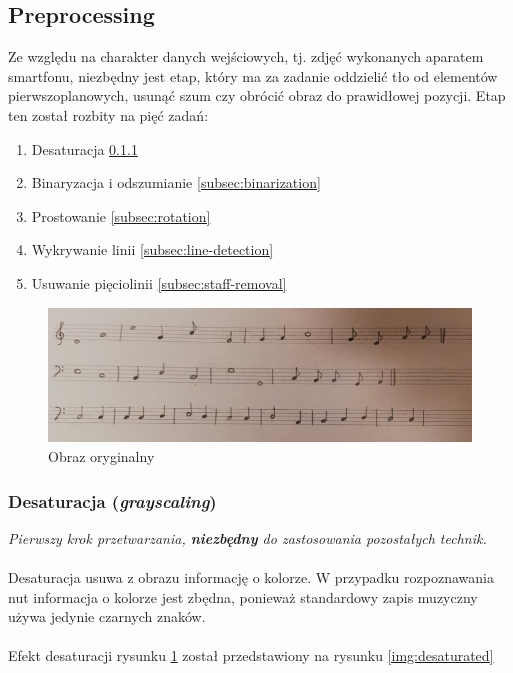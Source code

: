 \documentclass[12pt, letterpaper]{article}
\begin{document}
\subsection{Preprocessing}
\label{sec:preprocessing}

Ze względu na charakter danych wejściowych, tj. zdjęć wykonanych aparatem smartfonu,
niezbędny jest etap, który ma za zadanie oddzielić tło od elementów pierwszoplanowych,
usunąć szum czy obrócić obraz do prawidłowej pozycji.
Etap ten został rozbity na pięć zadań:

\begin{enumerate}
    \item Desaturacja \ref{subsec:desaturation}
    \item Binaryzacja i odszumianie \ref{subsec:binarization}
    \item Prostowanie \ref{subsec:rotation}
    \item Wykrywanie linii \ref{subsec:line-detection}
    \item Usuwanie pięciolinii \ref{subsec:staff-removal}
\end{enumerate}

\begin{figure}
    \centering
    \includegraphics[width = \imagewidth]{0_source}
    \caption[Source]{Obraz oryginalny}
    \label{img:source}
\end{figure}

\subsubsection{Desaturacja (\textit{\small grayscaling})}
\label{subsec:desaturation}

\textit{Pierwszy krok przetwarzania, \textbf{\small niezbędny} do zastosowania pozostałych technik.}
\\
\\
Desaturacja usuwa z obrazu informację o kolorze.
W przypadku rozpoznawania nut informacja o kolorze jest zbędna,
ponieważ standardowy zapis muzyczny używa jedynie czarnych znaków.
\\
\\
Efekt desaturacji rysunku \ref{img:source} został przedstawiony na
rysunku \ref{img:desaturated}
\end{document}
